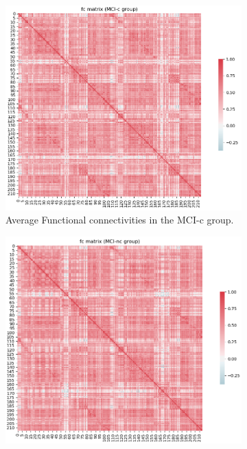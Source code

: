 \documentclass[a4paper,12pt]{elsarticle}  %
\begin{document}
		\begin{figure}[h]
			\centering
			\begin{subfigure}[a]{0.72\textwidth}
				\includegraphics[width=1\textwidth]{fig_FC_MCI-c_74sub.png}
				\caption{Average Functional connectivities in the MCI-c group.}
				\label{fig_FC_MCI-c_74sub} 
			\end{subfigure}
			\begin{subfigure}[b]{0.72\textwidth}
				\includegraphics[width=1\textwidth]{fig_FC_MCI-nc_74sub.png}

\end{subfigure}
\end{figure}
\end{document}
